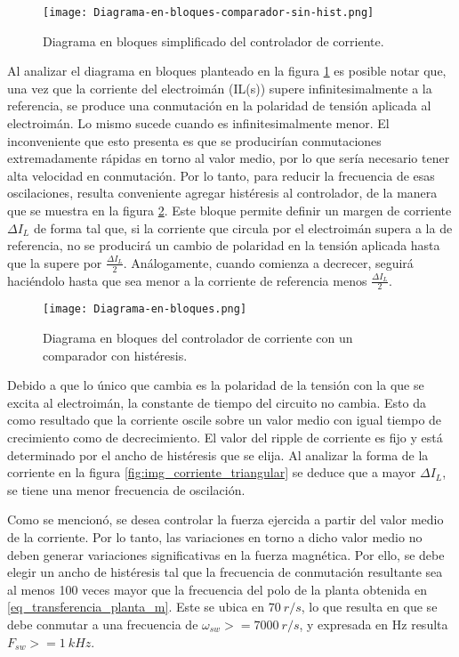 \begin{figure}[H]
	\centering
	\texttt{[image: Diagrama-en-bloques-comparador-sin-hist.png]}
	\caption{Diagrama en bloques simplificado del controlador de corriente.}
	\label{fig:img_diag-en-bloques-comparador-sin-hist}
\end{figure}

Al analizar el diagrama en bloques planteado en la figura \ref{fig:img_diag-en-bloques-comparador-sin-hist} es posible notar que, una vez que la corriente del electroimán (IL(s)) supere infinitesimalmente a la referencia, se produce una conmutación en la polaridad de tensión aplicada al electroimán. Lo mismo sucede cuando es infinitesimalmente menor. El inconveniente que esto presenta es que se producirían conmutaciones extremadamente rápidas en torno al valor medio, por lo que sería necesario tener alta velocidad en conmutación. Por lo tanto, para reducir la frecuencia de esas oscilaciones, resulta conveniente agregar histéresis al controlador, de la manera que se muestra en la figura \ref{fig:img_diag-en-bloques}. Este bloque permite definir un margen de corriente $\Delta I_L$ de forma tal que, si la corriente que circula por el electroimán supera a la de referencia, no se producirá un cambio de polaridad en la tensión aplicada hasta que la supere por $\frac{\Delta I_L}{2}$. Análogamente, cuando comienza a decrecer, seguirá haciéndolo hasta que sea menor a la corriente de referencia menos $\frac{\Delta I_L}{2}$.

\begin{figure}[H]
	\centering
	\texttt{[image: Diagrama-en-bloques.png]}
	\caption{Diagrama en bloques del controlador de corriente con un comparador con histéresis.}
	\label{fig:img_diag-en-bloques}
\end{figure}

Debido a que lo único que cambia es la polaridad de la tensión con la que se excita al electroimán, la constante de tiempo del circuito no cambia. Esto da como resultado  que la corriente oscile sobre un valor medio con igual tiempo de crecimiento como de decrecimiento. El valor del ripple de corriente es fijo y está determinado por el ancho de histéresis que se elija. Al analizar la forma de la corriente en la figura \ref{fig:img_corriente_triangular} se deduce que a mayor $\Delta I_L$, se tiene una menor frecuencia de oscilación. 

Como se mencionó, se desea controlar la fuerza ejercida a partir del valor medio de la corriente. Por lo tanto, las variaciones en torno a dicho valor medio no deben generar variaciones significativas en la fuerza magnética. Por ello, se debe elegir un ancho de histéresis tal que la frecuencia de conmutación resultante sea al menos 100 veces mayor que la frecuencia del polo de la planta obtenida en \ref{eq_transferencia_planta_m}. Este se ubica en $70\:r/s$, lo que resulta en que se debe conmutar a una frecuencia de $\omega_{sw}>=7000\:r/s$, y expresada en Hz resulta $F_{sw}>=1\:kHz$.

